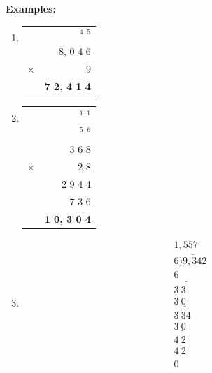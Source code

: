 \documentclass[11pt, a4paper]{article}
\begin{document}
\begin{center}
\end{center}

\vspace{1cm}

\textbf{Examples:}

\begin{enumerate}
    \item 
    \begin{tabular}{c r}
          & $^4$ $^5$ \\
          & 8, 0 4 6 \\
        $\times$ & 9 \\ \hline
          & \textbf{7 2, 4 1 4} \\ \hline
    \end{tabular}

    \item 
    \begin{tabular}{c r}
          & $^1$ $^1$ \\
          & $^5$ $^6$ \\
          & 3 6 8 \\
        $\times$ & 2 8 \\ \hline
          & 2 9 4 4 \\
          & 7 3 6 \phantom{0} \\ \hline
          & \textbf{1 0, 3 0 4} \\ \hline
    \end{tabular}

    \item 
    \[
    \begin{array}{r}
        1, 5 5 7 \\
        6 \overline{) 9, 3 4 2} \\
        \underline{6 \phantom{, 0 0 0}} \\
        3 \ 3 \phantom{4 2} \\
        \underline{3 \ 0 \phantom{4 2}} \\
        3 \ 3 4 \phantom{2} \\
        \underline{3 \ 0 \phantom{2}} \\
        4 \ 2 \\
        \underline{4 \ 2} \\
        0
    \end{array}
    \]
\end{enumerate}

\pagebreak
\setcounter{page}{36}
\end{document}
